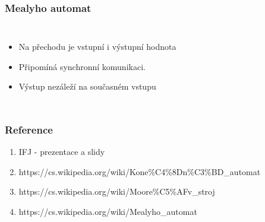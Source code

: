 \documentclass{beamer}
\begin{document}
\begin{frame}
\frametitle{Mealyho automat}
\begin{columns}
\begin{itemize}
    \item Na přechodu je vstupní i výstupní hodnota
    \item Připomíná synchronní komunikaci.
    \item Výstup nezáleží na současném vstupu
\end{itemize}

\end{columns}
\end{frame}



\begin{frame}
\frametitle{Reference}

\begin{enumerate}
    \item IFJ - prezentace a slidy
    \item \small{https://cs.wikipedia.org/wiki/Kone\%C4\%8Dn\%C3\%BD\_automat}
    \item \small{https://cs.wikipedia.org/wiki/Moore\%C5\%AFv\_stroj}
    \item \small{https://cs.wikipedia.org/wiki/Mealyho\_automat}
\end{enumerate}

\end{frame}
\end{document}
